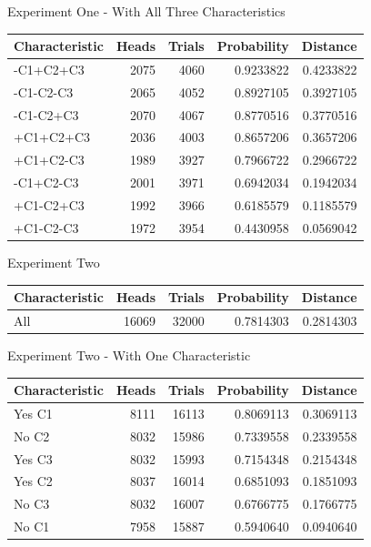 \documentclass[
  ignorenonframetext,
]{beamer}
\renewcommand{\,}{\text{, }}
\begin{document}
\begin{frame}{Experiment One - With All Three Characteristics}
\protect\hypertarget{experiment-one---with-all-three-characteristics}{}

\begin{longtable}[]{@{}lrrrr@{}}
\toprule
Characteristic & Heads & Trials & Probability & Distance\tabularnewline
\midrule
\endhead
-C1+C2+C3 & 2075 & 4060 & 0.9233822 & 0.4233822\tabularnewline
-C1-C2-C3 & 2065 & 4052 & 0.8927105 & 0.3927105\tabularnewline
-C1-C2+C3 & 2070 & 4067 & 0.8770516 & 0.3770516\tabularnewline
+C1+C2+C3 & 2036 & 4003 & 0.8657206 & 0.3657206\tabularnewline
+C1+C2-C3 & 1989 & 3927 & 0.7966722 & 0.2966722\tabularnewline
-C1+C2-C3 & 2001 & 3971 & 0.6942034 & 0.1942034\tabularnewline
+C1-C2+C3 & 1992 & 3966 & 0.6185579 & 0.1185579\tabularnewline
+C1-C2-C3 & 1972 & 3954 & 0.4430958 & 0.0569042\tabularnewline
\bottomrule
\end{longtable}

\end{frame}

\begin{frame}{Experiment Two}
\protect\hypertarget{experiment-two}{}

\begin{longtable}[]{@{}lrrrr@{}}
\toprule
Characteristic & Heads & Trials & Probability & Distance\tabularnewline
\midrule
\endhead
All & 16069 & 32000 & 0.7814303 & 0.2814303\tabularnewline
\bottomrule
\end{longtable}

\end{frame}

\begin{frame}{Experiment Two - With One Characteristic}
\protect\hypertarget{experiment-two---with-one-characteristic}{}

\begin{longtable}[]{@{}lrrrr@{}}
\toprule
Characteristic & Heads & Trials & Probability & Distance\tabularnewline
\midrule
\endhead
Yes C1 & 8111 & 16113 & 0.8069113 & 0.3069113\tabularnewline
No C2 & 8032 & 15986 & 0.7339558 & 0.2339558\tabularnewline
Yes C3 & 8032 & 15993 & 0.7154348 & 0.2154348\tabularnewline
Yes C2 & 8037 & 16014 & 0.6851093 & 0.1851093\tabularnewline
No C3 & 8032 & 16007 & 0.6766775 & 0.1766775\tabularnewline
No C1 & 7958 & 15887 & 0.5940640 & 0.0940640\tabularnewline
\bottomrule
\end{longtable}

\end{frame}
\end{document}
